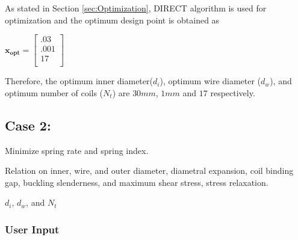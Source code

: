 \documentclass[10pt]{article}
\begin{document}
	As stated in Section \ref{sec:Optimization}, DIRECT algorithm is used for optimization and the optimum design point is obtained as 
	\begin{center}
	$\mathbf{x_{opt}} =
	\left[
	\begin{array}{c}
	 	 .03 \\
	 	 .001 \\
		 17    \\ 
		
	 \end{array}
	 \right]
$	
\end{center}
    Therefore, the optimum inner diameter($d_{i}$), optimum wire diameter ($d_{w}$), and optimum number of coils ($N_{t}$) are $30 mm$, $1 mm$ and $17$ respectively.
	
	
	
	

\newpage
\subsection{Case 2:}
\label{subsec:Case2}

\begin{description}[leftmargin=!,labelwidth=\widthof{\bfseries State Variables:}, labelindent = 1cm]
	\item[Objectives:] Minimize spring rate and spring index.\\
	\item[Constraints:] Relation on inner, wire, and outer diameter, diametral expansion, coil binding gap, buckling slenderness, and maximum shear stress, stress relaxation. \\
	\item[State Variables:] $d_{i}$, $d_{w}$, and $N_{t}$ \\
\end{description}

	\subsubsection{User Input}
	
\end{document}
